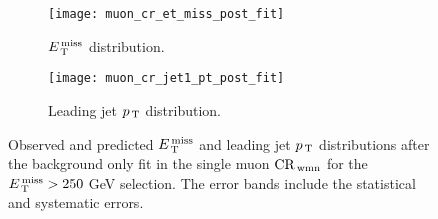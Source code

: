 \begin{figure}[!h]
  \centering
  \begin{subfigure}[t]{.48\linewidth}
    \texttt{[image: muon\_cr\_et\_miss\_post\_fit]}
    \caption{$E_\mathrm{\, T}^\mathrm{\, miss}$ distribution.}
    \label{fig:muon_cr_et_miss_pre_fit}
  \end{subfigure}
  \begin{subfigure}[t]{.48\linewidth}
    \texttt{[image: muon\_cr\_jet1\_pt\_post\_fit]}
    \caption{Leading jet $p_\mathrm{\, T}$ distribution.}
    \label{fig:muon_cr_jet1_pt_pre_fit}
  \end{subfigure}
  \caption{Observed and predicted $E_\mathrm{\, T}^\mathrm{\, miss}$ and leading jet $p_\mathrm{\, T}$ distributions
    after the background only fit in the single muon $\mathrm{CR}_\mathrm{\, wmn}$ for the
    $E_\mathrm{\, T}^\mathrm{\, miss} > 250~$GeV selection. The error bands include the statistical and
    systematic errors.}
  \label{fig:muon_cr_plots}
\end{figure}
